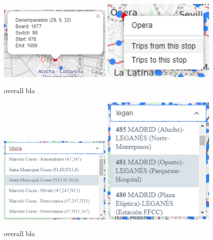 	\begin{figure}[ht]
		\begin{center}
			{\includegraphics[width=0.49\textwidth]{screens/stop_fix.png}}
			{\includegraphics[width=0.49\textwidth]{screens/rclick_cut.png}}
		\end{center}
		\caption{overall bla}
		\label{fig:ui:stop}
	\end{figure}
	
	\begin{figure}[ht]
		\begin{center}
			{\includegraphics[width=0.49\textwidth]{screens/stop-select_cut.png}}
			{\includegraphics[width=0.49\textwidth]{screens/lines-select_cut.png}}
		\end{center}
		\caption{overall bla}
		\label{fig:ui:select}
	\end{figure}
	

